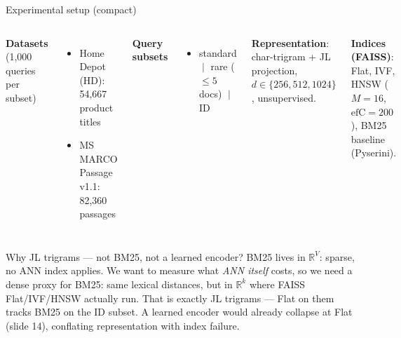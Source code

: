 \begin{frame}{Experimental setup (compact)}
  \begin{columns}[T]
    \textbf{Datasets} (1{,}000 queries per subset)
    \begin{itemize}
      \item Home Depot (HD): 54{,}667 product titles
      \item MS MARCO Passage v1.1: 82{,}360 passages
    \end{itemize}

    \textbf{Query subsets}
    \begin{itemize}
      \item standard $\;\vert\;$ rare ($\le 5$ docs) $\;\vert\;$ ID
    \end{itemize}

    \textbf{Representation}: char-trigram + JL projection,
    $d\in\{256,512,1024\}$, unsupervised.

    \textbf{Indices (FAISS)}: Flat, IVF, HNSW ($M{=}16$, $\text{efC}{=}200$),
    BM25 baseline (Pyserini).
  \end{columns}

  \vspace{0.8em}
  \begin{block}{Why JL trigrams --- not BM25, not a learned encoder?}
    BM25 lives in $\mathbb{R}^V$: sparse, no ANN index applies.
    We want to measure what \emph{ANN itself} costs, so we need a
    \alert{dense proxy for BM25}: same lexical distances, but in
    $\mathbb{R}^k$ where FAISS Flat/IVF/HNSW actually run.
    That is exactly JL trigrams --- Flat on them tracks BM25 on the ID subset.
    A learned encoder would already collapse at Flat (slide 14),
    conflating representation with index failure.
  \end{block}
\end{frame}

